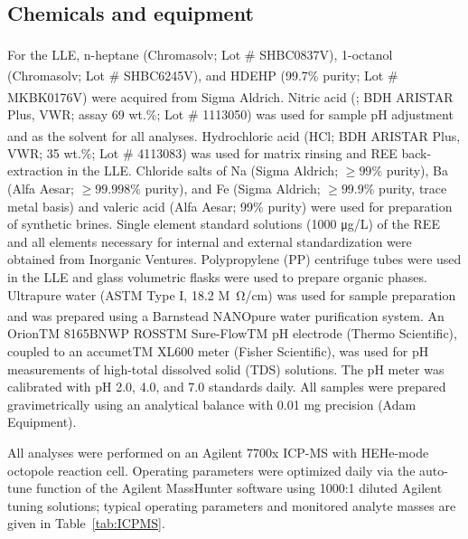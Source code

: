 \subsection{Chemicals and equipment}

For the LLE, n-heptane (Chromasolv\textsuperscript{\textregistered}; Lot \# SHBC0837V),
 1-octanol (Chromasolv\textsuperscript{\textregistered}; Lot \# SHBC6245V),
 and HDEHP (99.7\% purity; Lot \# MKBK0176V) were acquired from Sigma Aldrich.
 Nitric acid (; BDH ARISTAR\textsuperscript{\textregistered} Plus, VWR; assay 69 wt.\%; Lot \# 1113050) was used for sample pH adjustment and as the solvent for all analyses.
 Hydrochloric acid (HCl; BDH ARISTAR\textsuperscript{\textregistered} Plus, VWR; 35 wt.\%; Lot \# 4113083) was used for matrix rinsing and REE back-extraction in the LLE.
 Chloride salts of Na (Sigma Aldrich; $\geq99\%$ purity), Ba (Alfa Aesar; $\geq 99.998\%$ purity), and Fe (Sigma Aldrich; $\geq 99.9\%$ purity, trace metal basis) and valeric acid (Alfa Aesar; 99\% purity) were used for preparation of synthetic brines.
 Single element standard solutions (1000 \si{\ug}/L) of the REE and all elements necessary for internal and external standardization were obtained from Inorganic Ventures.
 Polypropylene (PP) centrifuge tubes were used in the LLE and glass volumetric flasks were used to prepare organic phases.
Ultrapure water (ASTM Type I, 18.2 \si{M\ohm}/cm) was used for sample preparation and was prepared using a Barnstead NANOpure\textsuperscript{\textregistered} water purification system.
An OrionTM 8165BNWP ROSSTM Sure-FlowTM pH electrode (Thermo Scientific), coupled to an accumetTM XL600 meter (Fisher Scientific), was used for pH measurements of high-total dissolved solid (TDS) solutions.
The pH meter was calibrated with pH 2.0, 4.0, and 7.0 standards daily.
All samples were prepared gravimetrically using an analytical balance with 0.01 mg precision (Adam Equipment).

All analyses were performed on an Agilent 7700x ICP-MS with HEHe-mode octopole reaction cell.
Operating parameters were optimized daily via the auto-tune function of the Agilent MassHunter software using 1000:1 diluted Agilent tuning solutions;
typical operating parameters and monitored analyte masses are given in Table~\ref{tab:ICPMS}.

